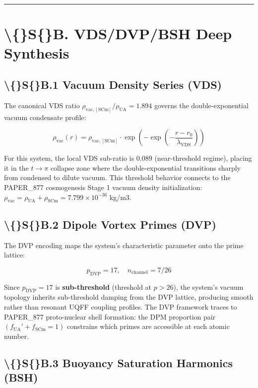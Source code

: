 \documentclass[11pt]{article}
\begin{document}
\noindent\rule{\textwidth}{0.4pt}

\section*{\textbackslash\{\}S\{\}B. VDS/DVP/BSH Deep Synthesis}

\subsection*{\textbackslash\{\}S\{\}B.1 Vacuum Density Series (VDS)}

The canonical VDS ratio $\rho_{\mathrm{vac,[SCm]}} / \rho_{\mathrm{UA}} = 1.894$ governs the double-exponential vacuum condensate profile:

$$\rho_{\mathrm{vac}}(r) = \rho_{\mathrm{vac,[SCm]}} \cdot \exp\!\left(-\exp\!\left(-\frac{r - r_0}{\lambda_{\mathrm{VDS}}}\right)\right)$$

For this system, the local VDS sub-ratio is $0.089$ (near-threshold regime), placing it in the $t \to \pi$ collapse zone where the double-exponential transitions sharply from condensed to dilute vacuum. This threshold behavior connects to the PAPER\_877 cosmogenesis Stage 1 vacuum density initialization: $\rho_{\mathrm{vac}} = \rho_{\mathrm{UA}} + \rho_{\mathrm{SCm}} = 7.799 \times 10^{-36}$ kg/m3.

\subsection*{\textbackslash\{\}S\{\}B.2 Dipole Vortex Primes (DVP)}

The DVP encoding maps the system's characteristic parameter onto the prime lattice:

$$p_{\mathrm{DVP}} = 17, \quad n_{\mathrm{channel}} = 7/26$$

Since $p_{\mathrm{DVP}} = 17$ is \textbf{sub-threshold} (threshold at $p > 26$), the system's vacuum topology inherits sub-threshold damping from the DVP lattice, producing smooth rather than resonant UQFF coupling profiles. The DVP framework traces to PAPER\_877 proto-nuclear shell formation: the DPM proportion pair $(f_{\mathrm{UA}}' + f_{\mathrm{SCm}} = 1)$ constrains which primes are accessible at each atomic number.

\subsection*{\textbackslash\{\}S\{\}B.3 Buoyancy Saturation Harmonics (BSH)}
\end{document}
